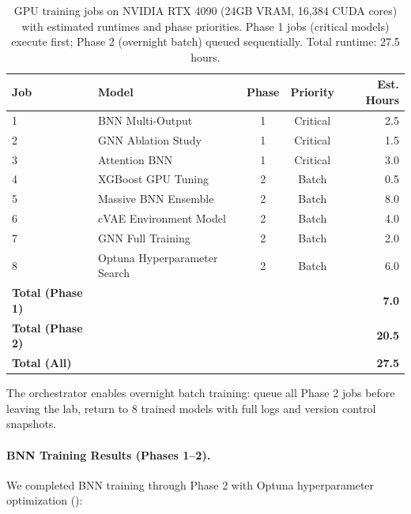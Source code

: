 \begin{table}[!ht]
\centering
\small
\caption[GPU training job schedule]{GPU training jobs on NVIDIA RTX 4090 (24GB VRAM, 16,384 CUDA cores) with estimated runtimes and phase priorities. Phase 1 jobs (critical models) execute first; Phase 2 (overnight batch) queued sequentially. Total runtime: 27.5 hours.}
\label{tab:gpu-training-jobs}
\begin{tabular}{llccr}
\toprule
\textbf{Job}  & \textbf{Model}  & \textbf{Phase}  & \textbf{Priority}  & \textbf{Est. Hours} \\
\midrule
1 & BNN Multi-Output & 1 & Critical & 2.5 \\
2 & GNN Ablation Study & 1 & Critical & 1.5 \\
3 & Attention BNN & 1 & Critical & 3.0 \\
4 & XGBoost GPU Tuning & 2 & Batch & 0.5 \\
5 & Massive BNN Ensemble & 2 & Batch & 8.0 \\
6 & cVAE Environment Model & 2 & Batch & 4.0 \\
7 & GNN Full Training & 2 & Batch & 2.0 \\
8 & Optuna Hyperparameter Search & 2 & Batch & 6.0 \\
\midrule
\textbf{Total (Phase 1)} & & & & \textbf{7.0} \\
\textbf{Total (Phase 2)} & & & & \textbf{20.5} \\
\textbf{Total (All)} & & & & \textbf{27.5} \\
\bottomrule
\end{tabular}
\end{table}

The orchestrator enables overnight batch training: queue all Phase 2 jobs before leaving the lab, return to 8 trained models with full logs and version control snapshots.

\paragraph{BNN Training Results (Phases 1--2).}
We completed BNN training through Phase 2 with Optuna hyperparameter optimization ():

